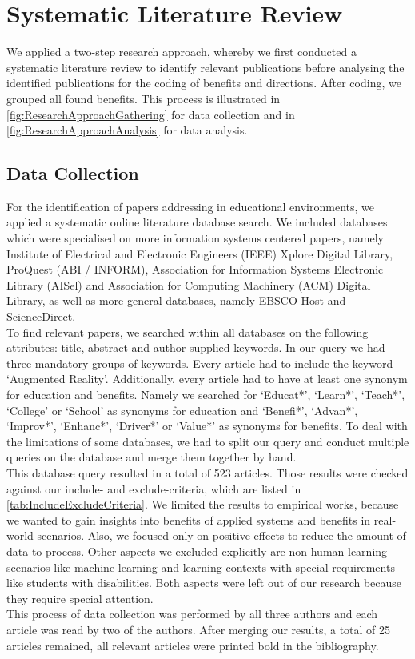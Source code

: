 \section{Systematic Literature Review}
\label{sec:SystematicLiteratureReview}
We applied a two-step research approach, whereby we first conducted a systematic literature review to identify relevant publications before analysing the identified publications for the coding of benefits and directions. After coding, we grouped all found benefits. This process is illustrated in \ref{fig:ResearchApproachGathering} for data collection and in \ref{fig:ResearchApproachAnalysis} for data analysis.

\subsection{Data Collection}
\label{subsec:DataCollection}
For the identification of papers addressing \AR in educational environments, we applied a systematic online literature database search. We included databases which were specialised on more information systems centered papers, namely Institute of Electrical and Electronic Engineers (IEEE) Xplore Digital Library, ProQuest (ABI / INFORM), Association for Information Systems Electronic Library (AISel) and Association for Computing Machinery (ACM) Digital Library, as well as more general databases, namely EBSCO Host and ScienceDirect.\\
To find relevant papers, we searched within all databases on the following attributes: title, abstract and author supplied keywords. In our query we had three mandatory groups of keywords. Every article had to include the keyword ‘Augmented Reality'. Additionally, every article had to have at least one synonym for education and benefits. Namely we searched for ‘Educat*’, ‘Learn*’, ‘Teach*’, ‘College’ or ‘School’ as synonyms for education and ‘Benefi*’, ‘Advan*’, ‘Improv*’, ‘Enhanc*’, ‘Driver*’ or ‘Value*’ as synonyms for benefits. To deal with the limitations of some databases, we had to split our query and conduct multiple queries on the database and merge them together by hand.\\
This database query resulted in a total of 523 articles. Those results were checked against our include- and exclude-criteria, which are listed in \ref{tab:IncludeExcludeCriteria}. We limited the results to empirical works, because we wanted to gain insights into benefits of applied systems and benefits in real-world scenarios. Also, we focused only on positive effects to reduce the amount of data to process. Other aspects we excluded explicitly are non-human learning scenarios like machine learning and learning contexts with special requirements like students with disabilities. Both aspects were left out of our research because they require special attention. \\
This process of data collection was performed by all three authors and each article was read by two of the authors. After merging our results, a total of 25 articles remained, all relevant articles were printed bold in the bibliography.

